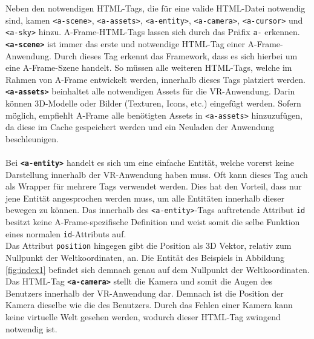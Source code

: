 \documentclass[a4paper,12pt,oneside]{article}
\begin{document}
        Neben den notwendigen HTML-Tags, die für eine valide HTML-Datei
        notwendig sind, kamen \texttt{<a-scene>}, \texttt{<a-assets>},
        \texttt{<a-entity>}, \texttt{<a-camera>}, \texttt{<a-cursor>}
        und \texttt{<a-sky>} hinzu. A-Frame-HTML-Tags lassen sich durch
        das Präfix \texttt{a-} erkennen. \\
        \texttt{\textbf{<a-scene>}} ist immer das erste und notwendige
        HTML-Tag einer A-Frame-Anwendung. Durch dieses Tag erkennt das Framework, 
        dass es sich hierbei um eine A-Frame-Szene handelt. 
        So müssen alle weiteren HTML-Tags, welche im Rahmen von A-Frame
        entwickelt werden, innerhalb dieses Tags platziert werden. \\
        \texttt{\textbf{<a-assets>}} beinhaltet alle notwendigen Assets für die 
        VR-Anwendung. Darin können 3D-Modelle oder 
        Bilder (Texturen, Icons, etc.) eingefügt werden. 
        Sofern möglich, empfiehlt A-Frame alle benötigten Assets in \texttt{<a-assets>}
        hinzuzufügen, da diese im Cache gespeichert werden und ein Neuladen
        der Anwendung beschleunigen. \\ \\
        Bei \texttt{\textbf{<a-entity>}} handelt es sich um eine einfache Entität,
        welche vorerst keine Darstellung innerhalb der VR-Anwendung haben
        muss. Oft kann dieses Tag auch als Wrapper für mehrere Tags verwendet
        werden. 
        Dies hat den Vorteil, dass nur jene Entität angesprochen werden muss,
        um alle Entitäten innerhalb dieser bewegen zu können.
        Das innerhalb des \texttt{<a-entity>}-Tags auftretende Attribut
        \texttt{id} besitzt keine A-Frame-spezifische Definition und weist
        somit die selbe Funktion eines normalen \texttt{id}-Attributs auf. \\
        Das Attribut \texttt{position} hingegen gibt die Position als 3D Vektor, 
        relativ zum Nullpunkt der Weltkoordinaten, an. Die Entität des
        Beispiels in Abbildung \ref{fig:index1} befindet
        sich demnach genau auf dem Nullpunkt der Weltkoordinaten. \\
        Das HTML-Tag \texttt{\textbf{<a-camera>}} stellt die Kamera und
        somit die Augen des Benutzers innerhalb der VR-Anwendung dar.
        Demnach ist die Position der Kamera dieselbe wie die 
        des Benutzers. 
        Durch das Fehlen einer Kamera kann keine virtuelle Welt gesehen werden,
        wodurch dieser HTML-Tag zwingend notwendig ist. \\
\end{document}

